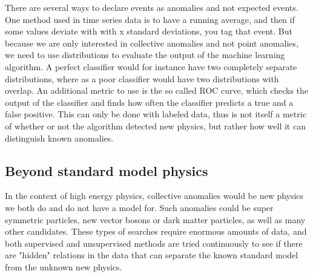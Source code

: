 \documentclass[ reprint, amsmath,amssymb, aps, nofootinbib]{revtex4-2}
\begin{document}
There are several ways to declare events as anomalies and not expected events. One method used in time series data is to have a running average, and then if some values deviate with with x standard deviations, you tag that event. But because we are only interested in collective anomalies and not point anomalies, we need to use distributions to evaluate the output of the machine learning algorithm. A perfect classifier would for instance have two completely separate distributions, where as a poor classifier would have two distributions with overlap. An additional metric to use is the so called ROC curve, which checks the output of the classifier and finds how often the classifier predicts a true and a false positive. This can only be done with labeled data, thus is not itself a metric of whether or not the algorithm detected new physics, but rather how well it can distinguish known anomalies.

\subsection{Beyond standard model physics}



In the context of high energy physics, collective anomalies would be new physics we both do and do not have a model for.  Such anomalies could be super symmetric particles\cite{JMLR:v18:16-558}, new vector bosons or dark matter particles, as well as many other candidates. These types of searches require enormous amounts of data, and both supervised and unsupervised methods are tried continuously to see if there are "hidden" relations in the data that can separate the known standard model from the unknown new physics. \par 
\end{document}
